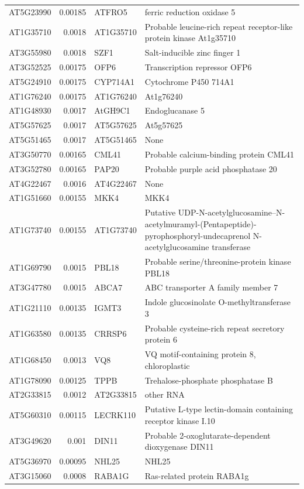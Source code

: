 \documentclass[11pt]{article}
\begin{document}
\begin{center}
\begin{tabular}{lrll}
AT5G23990 & 0.00185 & ATFRO5 & ferric reduction oxidase 5\\
AT1G35710 & 0.0018 & AT1G35710 & Probable leucine-rich repeat receptor-like protein kinase At1g35710\\
AT3G55980 & 0.0018 & SZF1 & Salt-inducible zinc finger 1\\
AT3G52525 & 0.00175 & OFP6 & Transcription repressor OFP6\\
AT5G24910 & 0.00175 & CYP714A1 & Cytochrome P450 714A1\\
AT1G76240 & 0.00175 & AT1G76240 & At1g76240\\
AT1G48930 & 0.0017 & AtGH9C1 & Endoglucanase 5\\
AT5G57625 & 0.0017 & AT5G57625 & At5g57625\\
AT5G51465 & 0.0017 & AT5G51465 & None\\
AT3G50770 & 0.00165 & CML41 & Probable calcium-binding protein CML41\\
AT3G52780 & 0.00165 & PAP20 & Probable purple acid phosphatase 20\\
AT4G22467 & 0.0016 & AT4G22467 & None\\
AT1G51660 & 0.00155 & MKK4 & MKK4\\
AT1G73740 & 0.00155 & AT1G73740 & Putative UDP-N-acetylglucosamine--N-acetylmuramyl-(Pentapeptide)-pyrophosphoryl-undecaprenol N-acetylglucosamine transferase\\
AT1G69790 & 0.0015 & PBL18 & Probable serine/threonine-protein kinase PBL18\\
AT3G47780 & 0.0015 & ABCA7 & ABC transporter A family member 7\\
AT1G21110 & 0.00135 & IGMT3 & Indole glucosinolate O-methyltransferase 3\\
AT1G63580 & 0.00135 & CRRSP6 & Probable cysteine-rich repeat secretory protein 6\\
AT1G68450 & 0.0013 & VQ8 & VQ motif-containing protein 8, chloroplastic\\
AT1G78090 & 0.00125 & TPPB & Trehalose-phosphate phosphatase B\\
AT2G33815 & 0.0012 & AT2G33815 & other RNA\\
AT5G60310 & 0.00115 & LECRK110 & Putative L-type lectin-domain containing receptor kinase I.10\\
AT3G49620 & 0.001 & DIN11 & Probable 2-oxoglutarate-dependent dioxygenase DIN11\\
AT5G36970 & 0.00095 & NHL25 & NHL25\\
AT3G15060 & 0.0008 & RABA1G & Ras-related protein RABA1g\\
\end{tabular}
\end{center}
\end{document}
